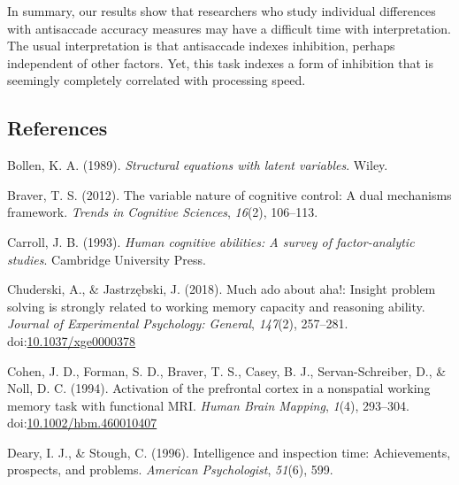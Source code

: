 \documentclass[
  ,man,floatsintext]{apa6}
\newlength{\cslhangindent}
\newlength{\cslentryspacingunit} %
\newenvironment{CSLReferences}[2] %
 {%
  \setlength{\parindent}{0pt}
  \ifodd #1
  \let\oldpar\par
  \def\par{\hangindent=\cslhangindent\oldpar}
  \fi
  \setlength{\parskip}{#2\cslentryspacingunit}
 }%
 {}
\begin{document}
In summary, our results show that researchers who study individual differences with antisaccade accuracy measures may have a difficult time with interpretation. The usual interpretation is that antisaccade indexes inhibition, perhaps independent of other factors. Yet, this task indexes a form of inhibition that is seemingly completely correlated with processing speed.

\newpage

\hypertarget{references}{%
\subsection*{References}\label{references}}

\hypertarget{refs}{}
\begin{CSLReferences}{1}{0}
\leavevmode{}%
Bollen, K. A. (1989). \emph{Structural equations with latent variables}. {Wiley}.

\leavevmode{}%
Braver, T. S. (2012). The variable nature of cognitive control: A dual mechanisms framework. \emph{Trends in Cognitive Sciences}, \emph{16}(2), 106--113.

\leavevmode{}%
Carroll, J. B. (1993). \emph{Human cognitive abilities: {A} survey of factor-analytic studies}. {Cambridge University Press}.

\leavevmode{}%
Chuderski, A., \& Jastrzębski, J. (2018). Much ado about aha!: {Insight} problem solving is strongly related to working memory capacity and reasoning ability. \emph{Journal of Experimental Psychology: General}, \emph{147}(2), 257--281. doi:\href{https://doi.org/10.1037/xge0000378}{10.1037/xge0000378}

\leavevmode{}%
Cohen, J. D., Forman, S. D., Braver, T. S., Casey, B. J., Servan-Schreiber, D., \& Noll, D. C. (1994). Activation of the prefrontal cortex in a nonspatial working memory task with functional {MRI}. \emph{Human Brain Mapping}, \emph{1}(4), 293--304. doi:\href{https://doi.org/10.1002/hbm.460010407}{10.1002/hbm.460010407}

\leavevmode{}%
Deary, I. J., \& Stough, C. (1996). Intelligence and inspection time: Achievements, prospects, and problems. \emph{American Psychologist}, \emph{51}(6), 599.


\end{CSLReferences}
\end{document}
